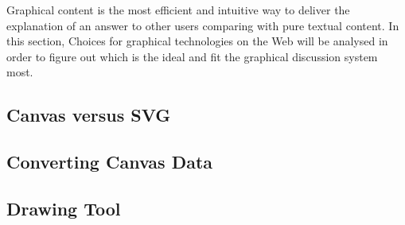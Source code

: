 
Graphical content is the most efficient and intuitive way to deliver the explanation of an answer to other users comparing with pure textual content. In this section, Choices for graphical technologies on the Web will be analysed in order to figure out which is the ideal and fit the graphical discussion system most. 


\subsection{Canvas versus SVG}



\subsection{Converting Canvas Data }



\subsection{Drawing Tool}
